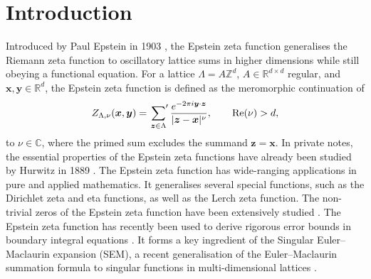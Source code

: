 \documentclass[]{amsart}
\newcommand{\new}[1]{#1}
\newcommand{\zeps}[3]{\new{Z_{#1} (#2, #3)}}
\newcommand{\sums}{\sideset{}{'} \sum}
\renewcommand{\Re}[1]{\mathrm{Re}(#1)}
\numberwithin{mythm}{section}
\begin{document}
\maketitle



\section{Introduction}
Introduced by Paul Epstein in 1903 \cite{epstein1903theorieI,epstein1903theorieII}, the Epstein zeta function generalises the Riemann zeta function to oscillatory lattice sums in higher dimensions while still obeying a functional equation.
For a lattice 
\(\Lambda=A\mathds Z^d\), 
\(A\in\mathds R^{d\times d}\) regular, and
\(\bm{x},\bm{y}\in\mathds{R}^d\),
the Epstein zeta function
is defined as the meromorphic continuation of
\[\zeps{\Lambda, \nu}{\bm x}{\bm y}
	=\sums_{\bm{z}\in\Lambda} \frac{e^{-2\pi i \bm{y}\cdot \bm{z}}}{|\bm{z}-\bm{x}|^{\nu}}
	,\qquad\Re\nu > d,
	\]
 to \(\nu\in\mathds{C}\), where the primed sum excludes the summand \(\bm{z}=\bm{x}\). 
 In private notes, the essential properties of the Epstein zeta functions have already been studied by Hurwitz in 1889 \cite{oswald2016aspects}.
The Epstein zeta function has wide-ranging applications in pure and applied mathematics.
It generalises several special functions, such as the Dirichlet zeta and eta functions, as well as the Lerch zeta function. The non-trivial zeros of the Epstein zeta function have been extensively studied \cite{stark1967zeros,ki2005all}. The Epstein zeta function has recently been used to derive rigorous error bounds in boundary integral equations \cite{wu2021corrected}. It forms a key ingredient of the Singular Euler--Maclaurin expansion (SEM), a recent generalisation of the Euler--Maclaurin summation formula to singular functions in multi-dimensional lattices \cite{buchheit2022efficient,buchheit2022singular}. 
\end{document}
